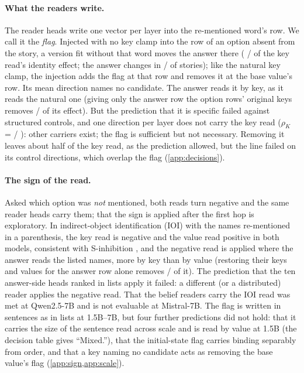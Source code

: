 \paragraph{What the readers write.}
The reader heads write one vector per layer into the re-mentioned word's row. We call it the \emph{flag}. Injected with no key clamp into the row of an option absent from the story, a version fit without that word moves the answer there (\JdOneRatioQwenSeven{} / \JdOneRatioMistralSeven{} of the key read's identity effect; the answer changes in \pct{\JdOnePiXQwenSeven} / \pct{\JdOnePiXMistralSeven} of stories)\rsk; like the natural key clamp, the injection adds the flag at that row and removes it at the base value's row. Its mean direction names no candidate. The answer reads it by key, as it reads the natural one (giving only the answer row the option rows' original keys removes \JdFourKQwenSeven{} / \JdFourKMistralSeven{} of its effect). But the prediction\rsk{} that it is specific failed against structured controls, and one direction per layer does not carry the key read ($\rho_K$ = \JdThreeRhoFlagQwenSeven{} / \JdThreeRhoFlagMistralSeven{}): other carriers exist; the flag is sufficient but not necessary. Removing it leaves about half of the key read, as the prediction\rsk{} allowed, but the line failed on its control directions, which overlap the flag (\cref{app:decisions}). %

\paragraph{The sign of the read.}
Asked which option was \emph{not} mentioned, both reads turn negative and the same reader heads carry them; that the sign is applied after the first hop is exploratory. In indirect-object identification (IOI) with the names re-mentioned in a parenthesis, the key read is negative and the value read positive in both models, consistent with S-inhibition \citep{wang2022ioi}, and the negative read is applied where the answer reads the listed names, more by key than by value (restoring their keys and values for the answer row alone removes \JdRouteKVQwenSeven{} / \JdRouteKVMistralSeven{} of it)\rsk. The prediction\rsk{} that the ten answer-side heads ranked in lists apply it failed: a different (or a distributed) reader applies the negative read. That the belief readers carry the IOI read\rsk{} was met at Qwen2.5-7B and is not evaluable at Mistral-7B. The flag is written in sentences as in lists at 1.5B--7B, but four further predictions\rsk{} did not hold: that it carries the size of the sentence read across scale and is read by value at 1.5B (the decision table gives ``Mixed.''), that the initial-state flag carries binding separably from order, and that a key naming no candidate acts as removing the base value's flag (\cref{app:sign,app:scale}).
